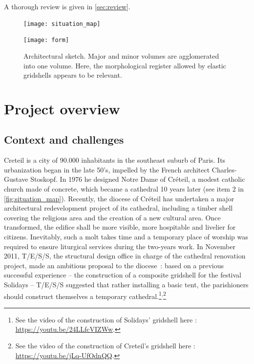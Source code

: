 A thorough review is given in \cref{sec:review}. 


\begin{figure}[p]
	\centering
	\begin{fullpage}
		\texttt{[image: situation\_map]}
		\caption[Situation map]{Situation map. The temporary gridshell (1) was built very close to the permanent cathedral (2). Remark that  the two buildings cover a quite similar projected area.}\label{fig:situation_map}    
		\vspace{1.5cm}
		\texttt{[image: form]}
		\caption[Architectural sketch]{Architectural sketch. Major and minor volumes are agglomerated into one volume. Here, the morphological register allowed by elastic gridshells appears to be relevant.}\label{fig:form}    
	\end{fullpage} 
\end{figure}

\section{Project overview}
\subsection{Context and challenges}
Creteil is a city of 90.000 inhabitants in the southeast suburb of Paris. Its urbanization began in the late 50’s, impelled by the French architect Charles-Gustave Stoskopf. In 1976 he designed Notre Dame of Créteil, a modest catholic church made of concrete, which became a cathedral 10 years later (see item 2 in \cref{fig:situation_map}). Recently, the diocese of Créteil has undertaken a major architectural redevelopment project of its cathedral, including a timber shell covering the religious area and the creation of a new cultural area. Once transformed, the edifice shall be more visible, more hospitable and livelier for citizens. Inevitably, such a molt takes time and a temporary place of worship was required to ensure liturgical services during the two-years work. In November 2011, T/E/S/S, the structural design office in charge of the cathedral renovation project, made an ambitious proposal to the diocese~: based on a previous successful experience – the construction of a composite gridshell for the festival Solidays \cite{Baverel2012} – T/E/S/S suggested that rather installing a basic tent, the parishioners should construct themselves a temporary cathedral.\footnote{See the video of the construction of Solidays' gridshell here : \url{https://youtu.be/24LLfcVIZWw}.}\textsuperscript{,}\footnote{See the video of the construction of Creteil's gridshell here : \url{https://youtu.be/jLq-UfOdnQQ}.}

